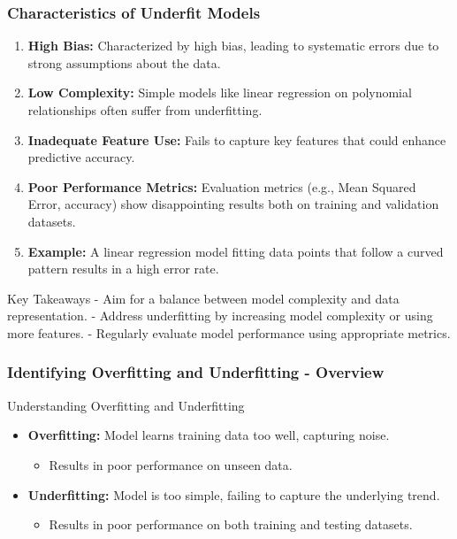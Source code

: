 \documentclass[aspectratio=169]{beamer}
\begin{document}
\begin{frame}[fragile]
    \frametitle{Characteristics of Underfit Models}
    
    \begin{enumerate}
        \item \textbf{High Bias:} Characterized by high bias, leading to systematic errors due to strong assumptions about the data.
        
        \item \textbf{Low Complexity:} Simple models like linear regression on polynomial relationships often suffer from underfitting.
        
        \item \textbf{Inadequate Feature Use:} Fails to capture key features that could enhance predictive accuracy.
        
        \item \textbf{Poor Performance Metrics:} Evaluation metrics (e.g., Mean Squared Error, accuracy) show disappointing results both on training and validation datasets.
        
        \item \textbf{Example:} A linear regression model fitting data points that follow a curved pattern results in a high error rate.
    \end{enumerate}
    
    \begin{block}{Key Takeaways}
        - Aim for a balance between model complexity and data representation.
        - Address underfitting by increasing model complexity or using more features.
        - Regularly evaluate model performance using appropriate metrics.
    \end{block}
\end{frame}

\begin{frame}[fragile]
    \frametitle{Identifying Overfitting and Underfitting - Overview}
    \begin{block}{Understanding Overfitting and Underfitting}
        \begin{itemize}
            \item \textbf{Overfitting:} Model learns training data too well, capturing noise. 
            \begin{itemize}
                \item Results in poor performance on unseen data.
            \end{itemize}
            \item \textbf{Underfitting:} Model is too simple, failing to capture the underlying trend.
            \begin{itemize}
                \item Results in poor performance on both training and testing datasets.
            \end{itemize}
        \end{itemize}
    \end{block}
\end{frame}
\end{document}
